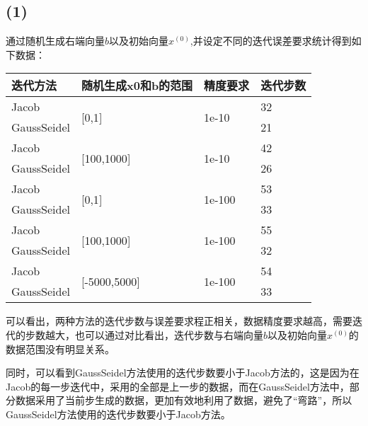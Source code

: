 \documentclass{article}
\begin{document}
\subsection{(1)}
通过随机生成右端向量$b$以及初始向量$x^{(0)}$,并设定不同的迭代误差要求统计得到如下数据：
\begin{table}[H]
\centering
\begin{tabular}{|l|l|l|l|}
\hline  
迭代方法        & 随机生成x0和b的范围                       & 精度要求                    & 迭代步数 \\ \hline
Jacob       & \multirow{2}{*}{{[}0,1{]}}        & \multirow{2}{*}{1e-10}  & 32   \\ \cline{1-1} \cline{4-4} 
GaussSeidel &                                   &                         & 21   \\ \hline
Jacob       & \multirow{2}{*}{{[}100,1000{]}}   & \multirow{2}{*}{1e-10}  & 42   \\ \cline{1-1} \cline{4-4} 
GaussSeidel &                                   &                         & 26   \\ \hline
Jacob       & \multirow{2}{*}{{[}0,1{]}}        & \multirow{2}{*}{1e-100} & 53   \\ \cline{1-1} \cline{4-4} 
GaussSeidel &                                   &                         & 33   \\ \hline
Jacob       & \multirow{2}{*}{{[}100,1000{]}}   & \multirow{2}{*}{1e-100} & 55   \\ \cline{1-1} \cline{4-4} 
GaussSeidel &                                   &                         & 32   \\ \hline
Jacob       & \multirow{2}{*}{{[}-5000,5000{]}} & \multirow{2}{*}{1e-100} & 54   \\ \cline{1-1} \cline{4-4} 
GaussSeidel &                                   &                         & 33   \\ \hline
\end{tabular}
\end{table}
可以看出，两种方法的迭代步数与误差要求程正相关，数据精度要求越高，需要迭代的步数越大，也可以通过对比看出，迭代步数与右端向量$b$以及初始向量$x^{(0)}$的数据范围没有明显关系。

同时，可以看到GaussSeidel方法使用的迭代步数要小于Jacob方法的，这是因为在Jacob的每一步迭代中，采用的全部是上一步的数据，而在GaussSeidel方法中，部分数据采用了当前步生成的数据，更加有效地利用了数据，避免了“弯路”，所以GaussSeidel方法使用的迭代步数要小于Jacob方法。
\end{document}
